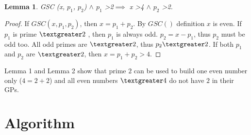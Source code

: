 \documentclass[10pt,twocolumn]{article}
\newtheorem{lemma}[theorem]{Lemma}
\begin{document}
\begin{lemma}
GSC (x, $p_1$, $p_2$) $\land$ $p_1$ \textgreater 2$\implies$ x \textgreater 4 $\land$ $p_2$ \textgreater 2.
\end{lemma}
\begin{proof}
If $GSC (x, p_1, p_2)$, then $x = p_1 + p_2$. By $GSC()$ definition $x$ is even. If $p_1$ is prime $\textgreater 2$ , then $p_1$ is always odd. $p_2 = x - p_1$, thus $p_2$ must be odd too. All odd primes are $\textgreater 2$, thus $p_2 \textgreater 2$. If both $p_1$ and $p_2$ are $\textgreater 2$, then $x = p_1 + p_2 > 4$.
\end{proof}

Lemma 1 and Lemma 2 show that prime $2$ can be used to build one even number only ($4 = 2 + 2$) and all even numbers $\textgreater 4$ do not have $2$ in their GPs.

\section{Algorithm}
\end{document}

